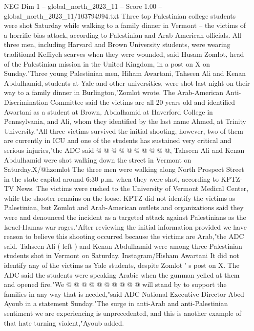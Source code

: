 \begin{textsample}{NEG Dim 1 – global\_north\_2023\_11 – Score 1.00 – global\_north\_2023\_11/103794994.txt}  \label{ex:f1_neg_195}
Three top Palestinian college students were shot Saturday while walking to a family dinner in Vermont -- the victims of a horrific bias attack, according to Palestinian and Arab-American officials.
All three men, including Harvard and Brown University students, were wearing traditional Keffiyeh scarves when they were wounded, said Husam Zomlot, head of the Palestinian mission in the United Kingdom, in a post on X on Sunday."Three young Palestinian men, Hiham Awartani, Tahseen Ali and Kenan Abdulhamid, students at Yale and other universities, were shot last night on their way to a family dinner in Burlington,"Zomlot wrote.
The Arab-American Anti-Discrimination Committee said the victims are all 20 years old and identified Awartani as a student at Brown, Abdalhamid at Haverford College in Pennsylvania, and Ali, whom they identified by the last name Ahmed, at Trinity University."All three victims survived the initial shooting, however, two of them are currently in ICU and one of the students has sustained very critical and serious injuries,"the ADC said @ @ @ @ @ @ @ @ @ @, Tahseen Ali and Kenan Abdulhamid were shot walking down the street in Vermont on Saturday.X/@hzomlot The three men were walking along North Prospect Street in the state capital around 6:30 p.m. when they were shot, according to KPTZ-TV News.
The victims were rushed to the University of Vermont Medical Center, while the shooter remains on the loose.
KPTZ did not identify the victims as Palestinian, but Zomlot and Arab-American outlets and organizations said they were and denounced the incident as a targeted attack against Palestinians as the Israel-Hamas war rages."After reviewing the initial information provided we have reason to believe this shooting occurred because the victims are Arab,"the ADC said.
Tahseen Ali ( left ) and Kenan Abdulhamid were among three Palestinian students shot in Vermont on Saturday.
Instagram/Hisham Awartani It did not identify any of the victims as Yale students, despite Zomlot ' s post on X.
The ADC said the students were speaking Arabic when the gunman yelled at them and opened fire."We @ @ @ @ @ @ @ @ @ @ will stand by to support the families in any way that is needed,"said ADC National Executive Director Abed Ayoub in a statement Sunday."The surge in anti-Arab and anti-Palestinian sentiment we are experiencing is unprecedented, and this is another example of that hate turning violent,"Ayoub added.

\end{textsample}
